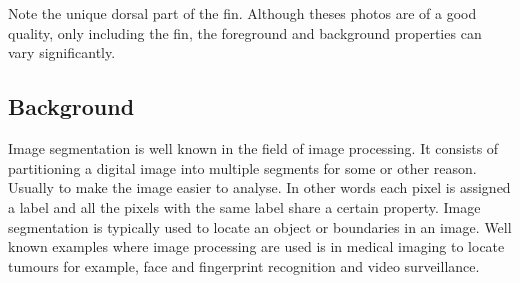 \documentclass[a4paper,10pt]{article}
\begin{document}
\begin{figure}[H]
\centering
\mbox{ \quad
{} \quad
{}}
\end{figure}

\begin{figure}[H]
\centering
\mbox{ \quad
{} \quad
{}}
\end{figure}

Note the unique dorsal part of the fin.  Although theses photos are of a good
quality, only including the fin, the foreground and background properties can
vary significantly.


\subsection{Background}
Image segmentation is well known in the field of image processing.  It consists
of partitioning a digital image into multiple segments for some or other reason.
 Usually to make the image easier to analyse.  In other words each pixel is
assigned a label and all the pixels with the same label share a certain
property.  Image segmentation is typically used to locate an object or
boundaries in an image.  Well known examples where image processing are used is
in medical imaging to locate tumours for example, face and
fingerprint recognition and video surveillance.
\end{document}
